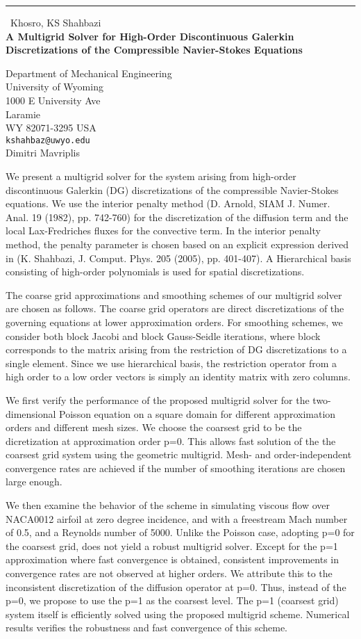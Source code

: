 \documentclass{report}
\begin{document}
\begin{center}
\rule{6in}{1pt} \
{\large Khosro, KS Shahbazi \\
{\bf A Multigrid Solver for High-Order Discontinuous Galerkin Discretizations of the Compressible Navier-Stokes Equations}}

Department of Mechanical Engineering \\ University of Wyoming \\ 1000 E University Ave \\ Laramie \\ WY 82071-3295 USA
\\
{\tt kshahbaz@uwyo.edu}\\
Dimitri Mavriplis\end{center}

We present a multigrid solver for the system arising from high-order
discontinuous Galerkin (DG) discretizations of the compressible
Navier-Stokes equations. We use the interior
penalty method (D. Arnold, SIAM J. Numer. Anal. 19 (1982), pp. 742-760)
for the discretization of the diffusion term and the local Lax-Fredriches
fluxes for the convective term. In the interior penalty method, the
penalty parameter is chosen based on an explicit expression derived in
(K. Shahbazi, J. Comput. Phys.
205 (2005), pp. 401-407). A Hierarchical basis consisting of high-order
polynomials is used for spatial discretizations.

The coarse grid approximations and smoothing schemes of our multigrid
solver are chosen as follows.
The coarse grid operators are direct discretizations of the governing
equations at lower approximation orders.
For smoothing schemes, we consider both block Jacobi and block
Gauss-Seidle iterations, where block corresponds to the matrix arising
from the restriction of DG discretizations to a single element. Since we
use hierarchical basis, the restriction operator from a high order to a
low order vectors is simply an identity matrix with zero columns.

We first verify the performance of the proposed multigrid solver for the
two-dimensional Poisson equation on a square domain for different
approximation orders and different mesh sizes.
We choose the coarsest grid to be the dicretization at approximation
order p=0. This allows fast solution of the
the coarsest grid system using the geometric multigrid. Mesh- and
order-independent convergence rates are achieved if the number of
smoothing iterations are chosen large enough.

We then examine the behavior of the scheme in simulating viscous flow
over NACA0012 airfoil at zero degree incidence, and with a freestream
Mach number of 0.5, and a Reynolds number of 5000.
Unlike the Poisson case, adopting p=0 for the coarsest grid,
does not yield a robust multigrid solver. Except for the p=1
approximation where fast convergence is obtained, consistent improvements
in convergence rates are not observed at higher
orders. We attribute this to the inconsistent discretization of the
diffusion operator at p=0. Thus, instead of the p=0, we propose to use
the p=1 as the coarsest level. The p=1 (coarsest grid) system itself is
efficiently solved using the proposed multigrid scheme.
Numerical results verifies the robustness and fast convergence of this scheme.
\end{document}
